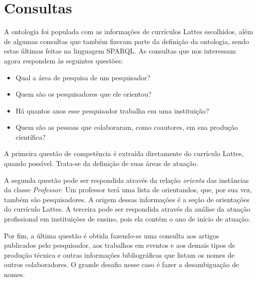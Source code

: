 \begin{comment}
  Classe: Local
  SubClassOf: Thing
  Descrição: \emph{Classe dos locais geográficos.}
  Relações:
    localizado \( \equiv \) foaf:based near \emph{Relaciona \textbf{Organização}
    ou \textbf{Evento} com um local geográfico.}

  Class: País
  SubClassOf: Local

  Class: Continente
  SubClassOf: Local

  Class: Cidade
  SubClassOf: Local

  \end{alltt}

\end{comment}

\section{Consultas}
\label{sec:desenvolvimento-consultas}

A ontologia foi populada com as informações de currículos Lattes escolhidos, além de algumas consultas que também fizeram parte da definição da ontologia, sendo estas últimas feitas na linguagem SPARQL. As consultas que nos interessam agora respondem às seguintes questões:

\begin{itemize}
    \item Qual a área de pesquisa de um pesquisador?
    \item Quem são os pesquisadores que ele orientou?
    \item Há quantos anos esse pesquisador trabalha em uma instituição?
    \item Quem são as pessoas que colaboraram, como coautores, em sua produção científica?
\end{itemize}

A primeira questão de competência é extraída diretamente do currículo Lattes, quando possível. Trata-se da definição de suas áreas de atuação.

A segunda questão pode ser respondida através da relação \textit{orienta} das instâncias da classe \textit{Professor}. Um professor terá uma lista de orientandos, que, por sua vez, também são pesquisadores. A origem dessas informações é a seção de orientações do currículo Lattes. A terceira pode ser respondida através da análise da atuação profissional em instituições de ensino, pois ela contém o ano de início de atuação.

Por fim, a última questão é obtida fazendo-se uma consulta aos artigos publicados pelo pesquisador, aos trabalhos em eventos e aos demais tipos de produção técnica e outras informações bibliográficas que listam os nomes de outros colaboradores. O grande desafio nesse caso é fazer a desambiguação de nomes.

